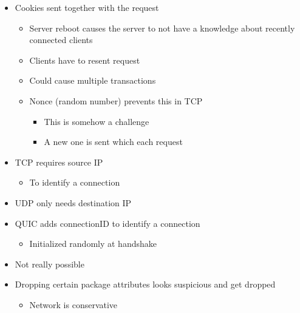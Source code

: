 \begin{itemize}
\begin{itemize}
\begin{itemize}
                        \begin{itemize}
                            \item Cookies sent together with the request
                                \begin{itemize}
                                    \item Server reboot causes the server to not have a knowledge about recently connected clients
                                    \item Clients have to resent request
                                    \item Could cause multiple transactions
                                    \item Nonce (random number) prevents this in TCP
                                        \begin{itemize}
                                            \item This is somehow a challenge
                                            \item A new one is sent which each request
                                        \end{itemize}
                                \end{itemize}
                        \end{itemize}
                \end{itemize}
                \begin{itemize}
                    \item TCP requires source IP
                        \begin{itemize}
                            \item To identify a connection
                        \end{itemize}
                    \item UDP only needs destination IP
                    \item QUIC adds connectionID to identify a connection
                        \begin{itemize}
                            \item Initialized randomly at handshake
                        \end{itemize}
                \end{itemize}
                \begin{itemize}
                    \item Not really possible
                    \item Dropping certain package attributes looks suspicious and get dropped
                        \begin{itemize}
                            \item Network is conservative
                        \end{itemize}
                \end{itemize}
        \end{itemize}
\end{itemize}

